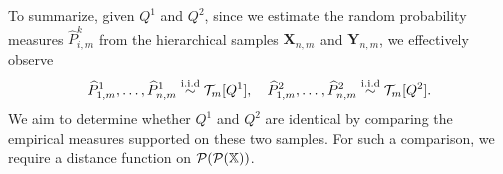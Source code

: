 To summarize, given $Q^1$ and $Q^2$, since we estimate the random probability measures $\widehat{P}^k_{i,m}$ from the hierarchical samples $\mathbf{X}_{n,m}$ and $\mathbf{Y}_{n,m}$, we effectively observe 
\begin{equation}\label{eq:equivalent_sampling_Tm}
\widehat{P}^1_{1,m}, \dots, \widehat{P}^1_{n,m} \overset{\mathrm{i.i.d}}{\sim} \mathcal{T}_m[Q^1], \quad \widehat{P}^2_{1,m}, \dots, \widehat{P}^2_{n,m} \overset{\mathrm{i.i.d}}{\sim} \mathcal{T}_m[Q^2].
\end{equation}
We aim to determine whether $Q^1$ and $Q^2$ are identical by comparing the empirical measures supported on these two samples. For such a comparison, we require a distance function on $\mathcal{P}(\mathcal{P}(\mathbb{X}))$.













